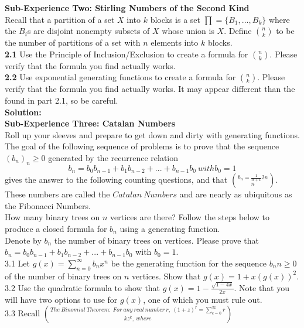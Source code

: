 \documentclass[10pt,a4paper]{report}
\begin{document}
	
	\textbf{Sub-Experience Two: Stirling Numbers of the Second Kind}\\
	Recall that a partition of a set $X$ into $k$ blocks is a set $\prod = \{B_1,...,B_k\}$ where the $B_i$s are disjoint nonempty subsets of $X$ whose union is $X$. Define ${n}\choose{k}$ to be the number of partitions of a set with $n$ elements into $k$ blocks.\\
	\textbf{2.1} Use the Principle of Inclusion/Exclusion to create a formula for ${n}\choose{k}$.  Please verify that the formula you find actually works.\\
	\textbf{2.2} Use exponential generating functions to create a formula for ${n}\choose{k}$.  Please verify that the formula you find actually works.  It may appear different than the found in part 2.1, so be careful.\\
	\textbf{Solution: }\\
	\newline
	\textbf{Sub-Experience Three: Catalan Numbers}\\
	Roll up your sleeves and prepare to get down and dirty with generating functions.  The goal of the following sequence of problems is to prove that the sequence $(b_n)_n\geq0$ generated by the recurrence relation\\
	\[b_n = b_0b_{n-1} + b_1b_{n-2} + ... + b_{n-1}b_0\ with b_0 = 1\]
	gives the answer to the following counting questions, and that $b_n = \frac{1}{n+1}{2n}\choose{n}$.  These numbers are called the $Catalan\ Numbers$ and are nearly as ubiquitous as the Fibonacci Numbers.\\
	\newline
	How many binary trees on $n$ vertices are there?  Follow the steps below to produce a closed formula for $b_n$ using a generating function.\\
	 Denote by $b_n$ the number of binary trees on vertices.  Please prove that $b_n = b_0b_{n-1} + b_1b_{n-2} + ... + b_{n-1}b_0$ with $b_0 = 1$.\\
	3.1 Let $g(x) = \sum_{n=0}^{\infty}b_nx^n$ be the generating function for the sequence $b_n n\geq0$ of the number of binary trees on $n$ vertices.  Show that $g(x) =1+x(g(x))^2$.\\
	3.2 Use the quadratic formula to show that $g(x) = 1-\frac{\sqrt{1-4x}}{2x}$. Note that you will have two options to use for $g(x)$, one of which you must rule out.\\
	3.3 Recall $The\ Binomial\ Theorem:\ For\ any\ real\ number\ r,\ (1+z)^r = \sum_{c=0}^{\infty} {r}\choose{k}z^k,\ where$\\
\end{document}
